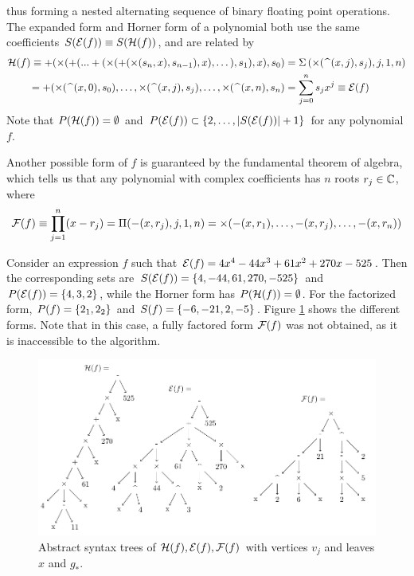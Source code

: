 \documentclass[]{elsarticle}
\begin{document}
thus forming a nested alternating sequence of binary floating point operations. 
The expanded form and Horner form of a polynomial both use the same \cite{epperson} coefficients $S(\mathcal{E}(f))\equiv S(\mathcal{H}(f))$, and are related by 
\begin{align*}
	\mc H(f) \equiv +(\times(+(...+(\times(+(\times(s_n,x),s_{n-1}),x),\dots),s_1),x),s_0) 
	&=\Sigma\plr{\times(\widehat{\ \ }(x,j),s_j),j,1,n} \\
	= +(\times(\widehat{\ \ }(x,0),s_0), \dots, \times(\widehat{\ \ }(x,j),s_j), \dots ,\times(\widehat{\ \ }(x,n),s_n)
	&= \sum_{j=0}^ns_jx^j \equiv \mc E(f)
\end{align*}
Note that $P(\mathcal{H}(f)) = \emptyset$ and $P(\mathcal{E}(f))\subset\left\{ 2,\dots,|S(\mathcal{E}(f))|+1 \right\}$ for any polynomial $f$.

Another possible form of $f$ is guaranteed by the fundamental theorem of algebra, which tells us that any polynomial with complex coefficients has $n$ roots $r_j\in\mathbb{C}$, where $$ \mathcal{F}(f) \equiv \prod_{j=1}^n (x-r_j) = \Pi(-(x,r_j),j,1,n) = \times(-(x,r_1),\dots,-(x,r_j),\dots,-(x,r_n)) $$

\begin{example}
	Consider an expression $f$ such that $\mathcal{E}(f) = 4x^4-44x^3+61x^2+270x-525$. Then the corresponding sets are $S(\mathcal{E}(f)) = \left\{ 4,-44,61,270,-525 \right\}$ and $P(\mathcal{E}(f)) = \left\{ 4,3,2 \right\}$, while the Horner form has $P(\mathcal{H}(f)) = \emptyset$. 
	For the factorized form, $P(f) = \left\{ 2_1,2_2 \right\}$ and $S(f) = \left\{ -6,-21,2,-5 \right\}$. Figure \ref{graph-tree} shows the different forms.
	Note that in this case, a fully factored form $\mathcal{F}(f)$ was not obtained, as it is inaccessible to the algorithm.
\end{example}

\begin{figure}[hb]
	\centering
	\includegraphics{figs/ast}
	\caption{Abstract syntax trees of $\mathcal{H}(f),\mathcal{E}(f),\mathcal{F}(f)$ with vertices $v_j$ and leaves $x$ and $g_*$.}
	\label{graph-tree}
\end{figure}
\end{document}
